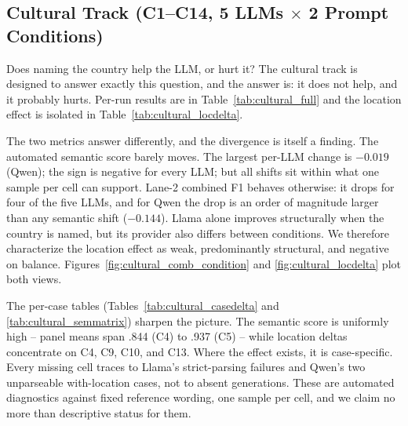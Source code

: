 \documentclass{article}
\begin{document}
\subsection{Cultural Track (C1--C14, 5 LLMs $\times$ 2 Prompt Conditions)}
Does naming the country help the LLM, or hurt it? The cultural track is designed to answer exactly this question, and the answer is: it does not help, and it probably hurts. Per-run results are in Table~\ref{tab:cultural_full} and the location effect is isolated in Table~\ref{tab:cultural_locdelta}.

The two metrics answer differently, and the divergence is itself a finding. The automated semantic score barely moves. The largest per-LLM change is $-0.019$ (Qwen); the sign is negative for every LLM; but all shifts sit within what one sample per cell can support. Lane-2 combined F1 behaves otherwise: it drops for four of the five LLMs, and for Qwen the drop is an order of magnitude larger than any semantic shift ($-0.144$). Llama alone improves structurally when the country is named, but its provider also differs between conditions. We therefore characterize the location effect as weak, predominantly structural, and negative on balance. Figures~\ref{fig:cultural_comb_condition} and \ref{fig:cultural_locdelta} plot both views.

The per-case tables (Tables~\ref{tab:cultural_casedelta} and \ref{tab:cultural_semmatrix}) sharpen the picture. The semantic score is uniformly high -- panel means span .844 (C4) to .937 (C5) -- while location deltas concentrate on C4, C9, C10, and C13. Where the effect exists, it is case-specific. Every missing cell traces to Llama's strict-parsing failures and Qwen's two unparseable with-location cases, not to absent generations. These are automated diagnostics against fixed reference wording, one sample per cell, and we claim no more than descriptive status for them.
\end{document}
